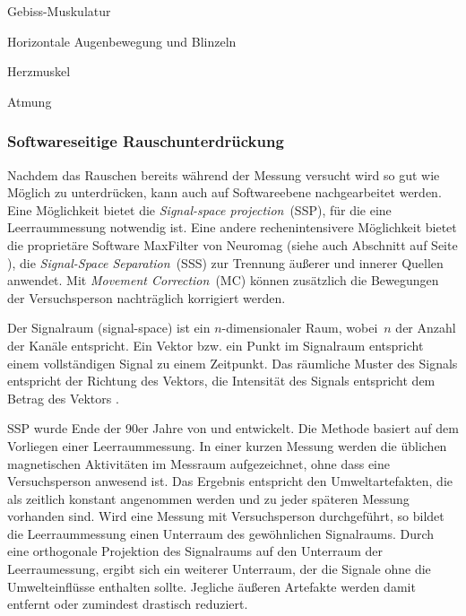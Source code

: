 \documentclass[doc,a4paper,12pt]{apa6}
\makeatletter
\DeclareRobustCommand*{\nameref}[1]{%
      \glqq{\myorg@nameref{#1}}\grqq%
    }%
\makeatother
\begin{document}
\begin{compactitem}
\item Gebiss-Muskulatur
\item Horizontale Augenbewegung und Blinzeln
\item Herzmuskel
\item Atmung
\end{compactitem}

\subsubsection{Softwareseitige Rauschunterdrückung}
\label{sec:maxfilter}

Nachdem das Rauschen bereits während der Messung versucht wird so gut wie Möglich zu unterdrücken, kann auch auf Softwareebene nachgearbeitet werden. Eine Möglichkeit bietet die \emph{Signal-space projection}~(SSP), für die eine Leerraummessung notwendig ist. Eine andere rechenintensivere Möglichkeit bietet die proprietäre Software MaxFilter von Neuromag (siehe auch Abschnitt \nameref{sec:software} auf Seite \pageref{sec:software}), die \emph{Signal-Space Separation}~(SSS) zur Trennung äußerer und innerer Quellen anwendet. Mit \emph{Movement Correction}~(MC) können zusätzlich die Bewegungen der Versuchsperson nachträglich korrigiert werden.

Der Signalraum (signal-space) ist ein $n$-dimensionaler Raum, wobei~$n$ der Anzahl der Kanäle entspricht. Ein Vektor bzw. ein Punkt im Signalraum entspricht einem vollständigen Signal zu einem Zeitpunkt. Das räumliche Muster des Signals entspricht der Richtung des Vektors, die Intensität des Signals entspricht dem Betrag des Vektors \parencite{hansen2010meg}.

SSP wurde Ende der 90er Jahre von \textcite{uusitalo1997signal} und \textcite{parkkonen1999interference} entwickelt. Die Methode basiert auf dem Vorliegen einer Leerraummessung. In einer kurzen Messung werden die üblichen magnetischen Aktivitäten im Messraum aufgezeichnet, ohne dass eine Versuchsperson anwesend ist. Das Ergebnis entspricht den Umweltartefakten, die als zeitlich konstant angenommen werden und zu jeder späteren Messung vorhanden sind. Wird eine Messung mit Versuchsperson durchgeführt, so bildet die Leerraummessung einen Unterraum des gewöhnlichen Signalraums. Durch eine orthogonale Projektion des Signalraums auf den Unterraum der Leerraumessung, ergibt sich ein weiterer Unterraum, der die Signale ohne die Umwelteinflüsse enthalten sollte. Jegliche äußeren Artefakte werden damit entfernt oder zumindest drastisch reduziert.
\end{document}
